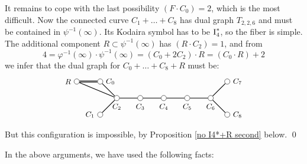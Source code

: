 \documentclass[oneside, 12pt]{amsart}
\theoremstyle{definition}
\theoremstyle{remark}
\newcommand{\I}{\text{\rm I}}
\newcommand{\inv}{{-1}}
\begin{document}
It remains to cope with the last possibility   $(F\cdot C_0)=2$, which is the most difficult. 
Now the connected curve $C_1+\ldots+C_8$ has dual graph $T_{2,2,6}$
and must be contained in $\psi^{-1}(\infty)$. Its Kodaira symbol has to be $\I_4^*$, so the fiber is simple. The additional
component $R\subset\psi^{-1}(\infty)$ has $(R\cdot C_2)=1$, and from
$$
4=\varphi^\inv(\infty)\cdot \psi^\inv(\infty) = (C_0+2C_2)\cdot R = (C_0\cdot R) + 2
$$
we infer that the dual graph for $C_0+\ldots+C_8+R$ must be:
\begin{equation*}
\begin{gathered}
\begin{tikzpicture}
[node distance=1cm, font=\small]
\tikzstyle{vertex}=[circle, draw, fill=white, inner sep=0mm, minimum size=1.5ex]
\node[vertex]	(C2)  	at (1,0) 	[label=below:{$C_2$}] 		{};
\node[vertex]	(C3)			[right of=C2, label=below:{$C_3$}]	{};
\node[vertex]	(C4)			[right of=C3, label=below:{$C_4$}]	{};
\node[vertex]	(C5)			[right of=C4, label=below:{$C_5$}]	{};
\node[vertex]	(C6)			[right of=C5, label=below:{$C_6$}]	{};

\node[vertex]	(C7)			[above right of=C6, label=right:{$C_7$}]	{};
\node[vertex]	(C8)			[below right of=C6, label=right:{$C_8$}]	{};
\node[vertex]	(C0)			[above left  of=C2, label=right :{$C_0$}]	{};
\node[vertex]	(C1)			[below left  of=C2, label=left :{$C_1$}]	{};
\node[vertex]	(R)				[left of=C0, label=left :{$R$}]	{};

\draw [thick] (C2)--(C3)--(C4)--(C5)--(C6);
\draw [thick] (C0)--(C2)--(C1);
\draw [thick] (C7)--(C6)--(C8);
\draw [thick, double] (C0)--(R);
\draw [thick] (C2)--(R);
\end{tikzpicture}
\end{gathered}
\end{equation*}
But this configuration is impossible, by Proposition \ref{no I4*+R second} below.
\qed

\medskip
In the above arguments, we have used the following facts:
\end{document}
